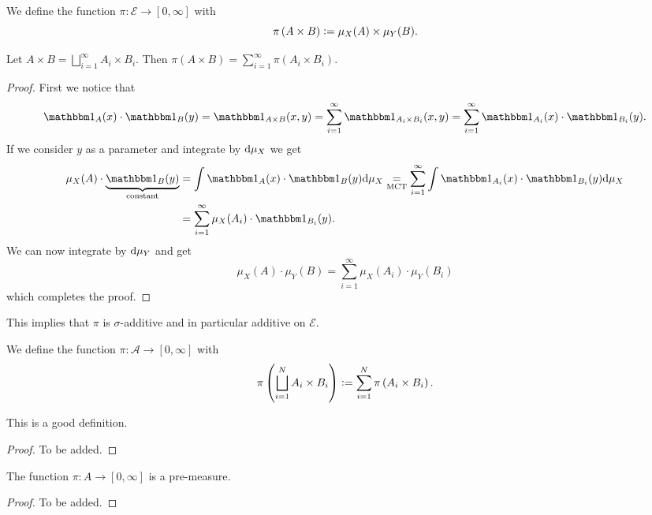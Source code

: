 \documentclass[11pt,a4paper]{article}
\newcommand{\A}{\mathcal A}
\begin{document}
\begin{definition}
  We define the function $\pi \colon \mathcal E \to [0,\infty]$ with
  \[
    \pi\del{A \times B} := \mu_X(A) \times \mu_Y(B).
  \]
\end{definition}
\begin{proposition}
  Let $A \times B = \bigsqcup_{i=1}^{\infty} A_i \times B_i$.
  Then $\pi(A \times B) = \sum_{i=1}^{\infty} \pi(A_i \times B_i)$.
\end{proposition}
\begin{proof}
  First we notice that
  \[
    \ind_A(x) \cdot \ind_B(y) =
    \ind_{A \times B}(x,y) =
    \sum_{i=1}^{\infty} \ind_{A_i \times B_i}(x,y) =
    \sum_{i=1}^{\infty} \ind_{A_i}(x) \cdot \ind_{B_i}(y).
  \]
  If we consider $y$ as a parameter and integrate by $\mathrm{d} \mu_X$ we get
  \begin{align*}
    \mu_X(A) \cdot \underbrace{\ind_B(y)}_{\text{constant}} &=
    \int \ind_A(x) \cdot \ind_B(y) \dmu_X \underset{\text{MCT}}{=}
    \sum_{i=1}^{\infty} \int \ind_{A_i}(x) \cdot \ind_{B_i}(y) \dmu_X \\ &=
    \sum_{i=1}^{\infty} \mu_X(A_i) \cdot \ind_{B_i}(y).
  \end{align*}
  We can now integrate by $\mathrm{d} \mu_Y$ and get
  \[
    \mu_X(A) \cdot \mu_Y(B) =
    \sum_{i=1}^{\infty} \mu_X(A_i) \cdot \mu_Y(B_i)
  \]
  which completes the proof.
\end{proof}
\begin{remark}
  This implies that $\pi$ is $\sigma$-additive and in particular additive
  on $\mathcal E$.
\end{remark}

\begin{definition}
  We define the function $\pi \colon \A \to [0,\infty]$ with
  \[
    \pi\del{\bigsqcup_{i=1}^{N} A_i \times B_i} :=
    \sum_{i=1}^{N} \pi\del{A_i \times B_i}.
  \]
\end{definition}
\begin{proposition}
  This is a good definition.
\end{proposition}
\begin{proof}
  To be added.
\end{proof}

\begin{corollary}
  The function $\pi \colon A \to [0,\infty]$ is a pre-measure.
\end{corollary}
\begin{proof}
  To be added.
\end{proof}
\end{document}
